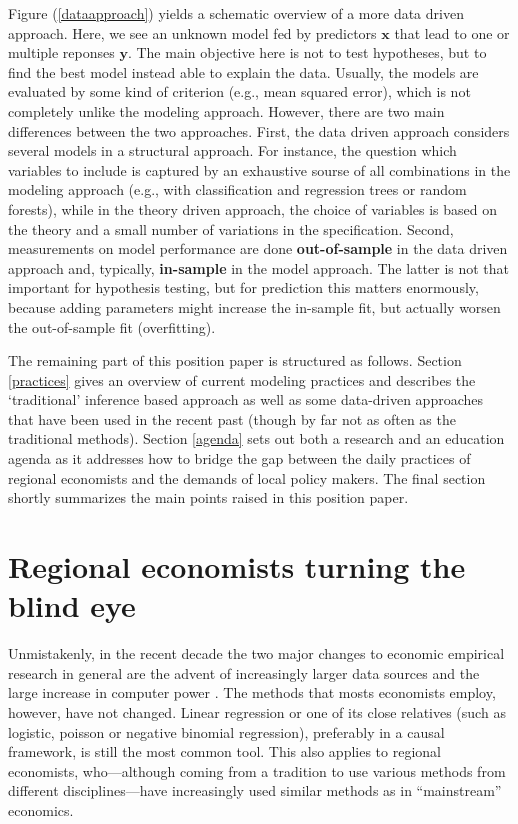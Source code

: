 \documentclass[fleqn,10pt]{SelfArx} %
\begin{document}
Figure (\ref{dataapproach}) yields a schematic overview of a more data driven
approach. Here, we see an unknown model fed by predictors $\mathbf{x}$ that lead
to one or multiple reponses $\mathbf{y}$. The main objective here is not to test
hypotheses, but to find the best model instead able to explain the data.
Usually, the models are evaluated by some kind of criterion (e.g., mean squared
error), which is not completely unlike the modeling approach. However, there are
two main differences between the two approaches. First, the data driven approach
considers several models in a structural approach. For instance, the question
which variables to include is captured by an exhaustive sourse of all
combinations in the modeling approach (e.g., with classification and regression
trees or random forests), while in the theory driven approach, the choice of
variables is based on the theory and a small number of variations in the
specification. Second, measurements on model performance are done
\textbf{out-of-sample} in the data driven approach and, typically,
\textbf{in-sample} in the model approach. The latter is not that important for
hypothesis testing, but for prediction this matters enormously, because adding
parameters might increase the in-sample fit, but actually worsen the
out-of-sample fit (overfitting).  


The remaining part of this position paper is structured as follows. Section
\ref{practices} gives an overview of current modeling practices and describes the `traditional'
inference based approach as well as some data-driven approaches that have been
used in the recent past (though by far not as often as the traditional methods).
Section \ref{agenda} sets out both a research and an education agenda as it
addresses how to bridge the gap between the daily practices of regional
economists and the demands of local policy makers. The final section shortly
summarizes the main points raised in this position paper.  


\section{Regional economists turning the blind eye\label{practices}}

Unmistakenly, in the recent decade the two major changes to economic empirical research in general
are the advent of increasingly larger data sources and the large increase in
computer power \citep[]{einav2014economics}. The methods that mosts economists
employ, however, have not changed. Linear regression or one of its close
relatives (such as logistic, poisson or negative binomial regression), preferably in a causal
framework, is still the most common tool. This also applies to regional
economists, who---although coming from a tradition to use various methods from
different disciplines---have increasingly used similar methods as in
``mainstream'' economics.
\end{document}

